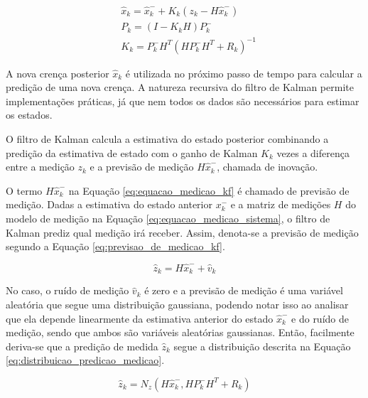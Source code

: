 \documentclass[acronym, symbols, table]{fei}
\begin{document}
				\begin{equation} \label{eq:equacao_medicao_kf}
					\begin{split}
						&\hat{x}_{k} = \hat{x}_{k}^{-} + K_{k}(z_k - H\hat{x}_{k}^{-}) \\
						&P_{k} = (I - K_kH)P_{k}^{-} \\
						&K_k =  P_{k}^{-}H^T(HP_{k}^{-}H^T + R_k)^{-1}
					\end{split}
				\end{equation}
			
				A nova crença posterior $\hat{x}_{k}$ é utilizada no próximo passo de tempo para calcular a predição de uma nova crença. A natureza recursiva do filtro de Kalman permite implementações práticas, já que nem todos os dados são necessários para estimar os estados.
				
				O filtro de Kalman calcula a estimativa do estado posterior combinando a predição da estimativa de estado com o ganho de Kalman $K_k$ vezes a diferença entre a medição $z_k$ e a previsão de medição $H\hat{x}_{k}^{-}$, chamada de inovação.
				
				O termo $H\hat{x}_{k}^{-}$ na Equação \eqref{eq:equacao_medicao_kf} é chamado de previsão de medição. Dadas a estimativa do estado anterior ${x}_{k}^{-}$ e a matriz de medições $H$ do modelo de medição na Equação \eqref{eq:equacao_medicao_sistema}, o filtro de Kalman prediz qual medição irá receber. Assim, denota-se a previsão de medição segundo a Equação \eqref{eq:previsao_de_medicao_kf}.
				
				\begin{equation} \label{eq:previsao_de_medicao_kf}
					\hat{z}_k = H\hat{x}_{k}^{-} + \hat{v}_k
				\end{equation}
			
				No caso, o ruído de medição $\hat{v}_k$ é zero e a previsão de medição é uma variável aleatória que segue uma distribuição gaussiana, podendo notar isso ao analisar que ela depende linearmente da estimativa anterior do estado $\hat{x}_{k}^{-}$ e do ruído de medição, sendo que ambos são variáveis aleatórias gaussianas. Então, facilmente deriva-se que a predição de medida $\hat{z}_k$ segue a distribuição descrita na Equação \eqref{eq:distribuicao_predicao_medicao}.
				
				\begin{equation} \label{eq:distribuicao_predicao_medicao}
					\hat{z}_k = N_z( H\hat{x}_{k}^{-}, HP_{k}^{-}H^T + R_k)
				\end{equation}
			
\end{document}
